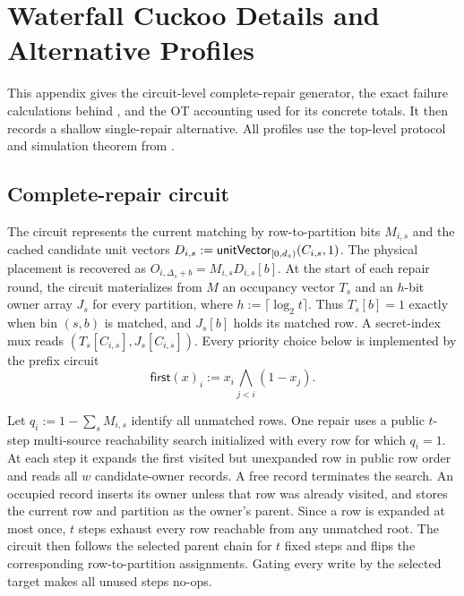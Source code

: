 \section{Waterfall Cuckoo Details and Alternative Profiles}
\label{app:waterfall-details}

This appendix gives the circuit-level complete-repair generator, the exact
failure calculations behind , and the OT
accounting used for its concrete totals.  It then records a shallow
single-repair alternative.  All profiles use the top-level protocol and
simulation theorem from .

\subsection{Complete-repair circuit}

The circuit represents the current matching by row-to-partition bits
$M_{i,s}$ and the cached candidate unit vectors
$D_{i,s}:=\mathsf{unitVector}_{[0,d_s)}(C_{i,s},1)$.  The physical placement is recovered
as $O_{i,\Delta_s+b}=M_{i,s}D_{i,s}[b]$.  At the start of each repair round,
the circuit materializes from $M$ an occupancy vector $T_s$ and an $h$-bit
owner array $J_s$ for every partition, where $h:=\lceil\log_2t\rceil$.
Thus $T_s[b]=1$ exactly when bin $(s,b)$ is matched, and $J_s[b]$ holds its
matched row.  A secret-index mux reads
$(T_s[C_{i,s}],J_s[C_{i,s}])$.  Every priority choice below is implemented by
the prefix circuit
\[
 \mathsf{first}(x)_i:=x_i\bigwedge_{j<i}(1-x_j).
\]

Let $q_i:=1-\sum_sM_{i,s}$ identify all unmatched rows.  One repair uses a
public $t$-step multi-source reachability search initialized with every row for
which $q_i=1$.  At each step it expands the first visited but unexpanded row in
public row order and reads all $w$ candidate-owner records.  A free record
terminates the search.  An occupied record inserts its owner unless that row
was already visited, and stores the current row and partition as the owner's
parent.  Since a row is expanded at most once, $t$ steps exhaust every row
reachable from any unmatched root.  The circuit then follows the selected
parent chain for $t$ fixed steps and flips the corresponding row-to-partition
assignments.  Gating every write by the selected target makes all unused steps
no-ops.


